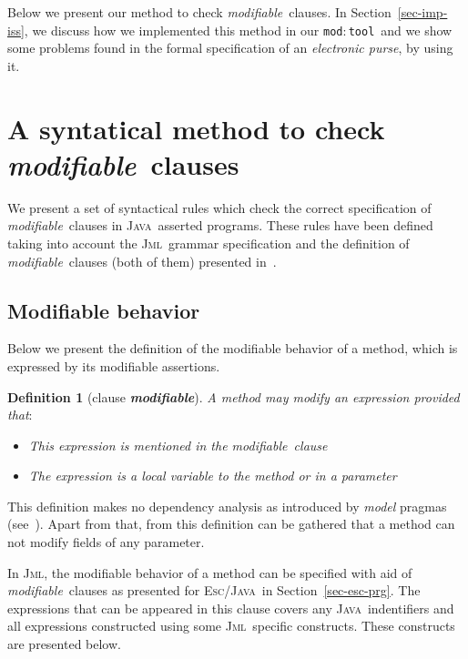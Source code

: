 \documentclass[a4paper]{llncs}
\newcommand{\jml}{\textsc{Jml}}
\newcommand{\escj}{\textsc{Esc/Java}}
\newcommand{\java}{\textsc{Java}}
\newcommand{\modtool}{\texttt{mod$:$tool}}
\newcommand{\modif}{\textit{modifiable}}
\newtheorem {df}{Definition}
\begin{document}
Below we present our method to check \modif~clauses. In
Section~\ref{sec-imp-iss}, we discuss how we implemented this method
in our \modtool~and we show
some problems found in the formal specification of an
\emph{electronic purse}, by using it.






\section{A syntatical method to check \modif~clauses}
\label{sec-giv-sin-def}
We present a set of syntactical rules which check the correct
specification of \modif~clauses in \java~asserted programs. These
rules have been defined taking into account the \jml~grammar
specification and the definition of \modif~clauses (both of them)
presented in~\cite{LBR00}.




\subsection{Modifiable behavior}
Below we present the definition of the modifiable behavior of a
method, which is expressed by its modifiable assertions.
\begin{df}[clause {\bf \it modifiable}]
\label{def-mod}
A method may modify an expression provided that$:$ 
\begin{itemize}
\item This expression is mentioned in the \modif~clause
\item The expression is a local variable to the method or in a
parameter
\end{itemize}
\end{df}
This definition makes no dependency analysis as introduced by
\emph{model} pragmas (see~\cite{LBR00}). Apart from that, from this definition can be
gathered that a method can not modify fields of any parameter.

In \jml, the modifiable behavior of a method can be specified with
aid of \modif~clauses as presented for \escj~in
Section~\ref{sec-esc-prg}. The expressions that can be appeared in this
clause covers any
\java~indentifiers and all expressions constructed using some
\jml~specific constructs. These constructs are presented below.
\end{document}
